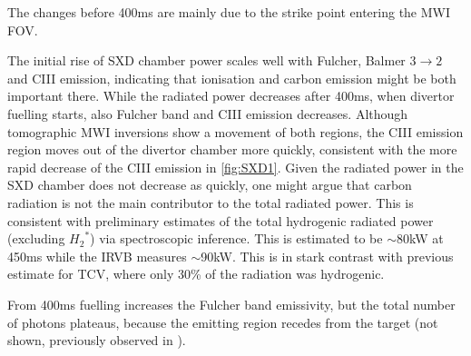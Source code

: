 The changes before 400ms are mainly due to the strike point entering the MWI FOV.

The initial rise of SXD chamber power scales well with Fulcher, Balmer $3 \rightarrow 2$ and CIII emission, indicating that ionisation and carbon emission might be both important there. While the radiated power decreases after 400ms, when divertor fuelling starts, also Fulcher band and CIII emission decreases. Although tomographic MWI inversions show \cite{Wijkamp2022} a movement of both regions, the CIII emission region moves out of the divertor chamber more quickly, consistent with the more rapid decrease of the CIII emission in \autoref{fig:SXD1}. Given the radiated power in the SXD chamber does not decrease as quickly, one might argue that carbon radiation is not the main contributor to the total radiated power. This is consistent with preliminary estimates of the total hydrogenic radiated power (excluding ${H_2}^*$) via spectroscopic inference. This is estimated to be $\sim$80kW at 450ms while the IRVB measures $\sim$90kW. This is in stark contrast with previous estimate for TCV, where only 30\% of the radiation was hydrogenic.\cite{Verhaegh2019,Verhaegh2021}


From 400ms fuelling increases the Fulcher band emissivity, but the total number of photons plateaus, because the emitting region recedes from the target (not shown, previously observed in \cite{Verhaegh2022}).



